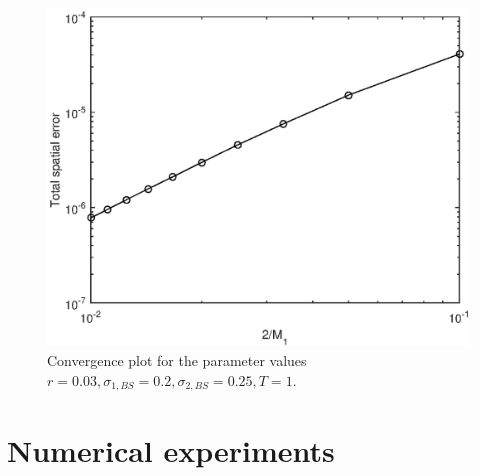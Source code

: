 \documentclass[10pt]{article}
\begin{document}
\begin{figure}
\begin{center}
\includegraphics[scale=0.5]{Convergence2DBS.eps}  
\caption{Convergence plot for the parameter values $r = 0.03, \sigma_{1,BS} = 0.2, \sigma_{2,BS}=0.25, T=1$.}
\label{fig:Convergence2DBS}
\end{center}
\end{figure}















\setcounter{equation}{0}
\section{Numerical experiments}\label{Experiments}






\setcounter{equation}{0}
\end{document}
